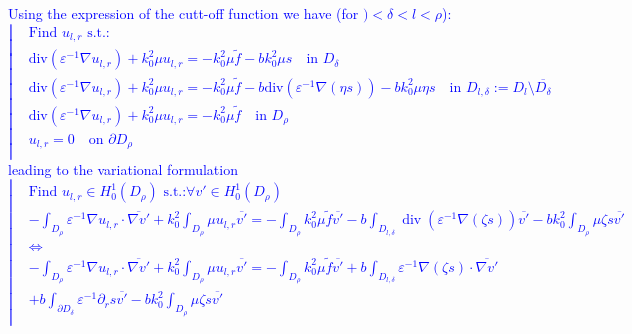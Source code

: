\documentclass[11pt]{article}
\newcommand{\grad}{\nabla}
\DeclareMathOperator{\diver}{{\mathrm{div}}}
\theoremstyle{plain}
\begin{document}
\textcolor{blue}{
Using the expression of the cutt-off function we have (for $) < \delta < l < \rho$):
\begin{equation}\label{eq:liftpbregbis}
\left|
\begin{aligned}
&\text{Find } u_{l,r} \text{ s.t.:} \\
&\displaystyle\text{div}\left(\varepsilon^{-1}\nabla u_{l,r}  \right) + {k_0^2} \mu  u_{l,r}  = - {k_0^2} \mu  \tilde{f}  - b {k_0^2} \mu  s\quad \text{in } D_\delta \\
&\displaystyle\text{div}\left(\varepsilon^{-1}\nabla u_{l,r}  \right) + {k_0^2} \mu  u_{l,r}  = - {k_0^2} \mu  \tilde{f} - b \displaystyle\text{div}\left(\varepsilon^{-1}\nabla (\eta s)  \right) - b {k_0^2} \mu  \eta s\quad \text{in } D_{l,\delta} := D_l \setminus \overline{D_\delta} \\
&\displaystyle\text{div}\left(\varepsilon^{-1}\nabla u_{l,r}  \right) + {k_0^2} \mu  u_{l,r}  = - {k_0^2} \mu  \tilde{f} \quad \text{in } D_\rho \\
& u_{l,r} = 0 \quad \text{on } \partial D_\rho \\
\end{aligned}
\right.
\end{equation}
leading to the variational formulation
\begin{equation}\label{FV_lift_reg_part_bis}
\left|
\begin{aligned}
&\text{Find } u_{l,r} \in H^1_0(D_\rho)\text{ s.t.:} \forall v' \in H^1_0(D_\rho) \\
&\displaystyle - \int_{D_\rho} \varepsilon^{-1}\nabla u_{l,r} \cdot \overline{\grad v'} + {k_0^2}\int_{D_\rho}  \mu  u_{l,r}  \overline{v'}= \displaystyle - \int_{D_\rho}  {k_0^2} \mu  \tilde{f} \overline{v'} - b \displaystyle  \int_{D_{l,\delta}} \displaystyle \diver(\varepsilon^{-1}\nabla (\zeta s) ) \overline{ v'} - b {k_0^2} \displaystyle  \int_{D_\rho} \mu  \zeta s  \overline{v'}\\
&\Longleftrightarrow \\
&\displaystyle - \int_{D_\rho} \varepsilon^{-1}\nabla u_{l,r} \cdot \overline{\grad v'} + {k_0^2}\int_{D_\rho}  \mu  u_{l,r}  \overline{v'}= \displaystyle - \int_{D_\rho}  {k_0^2} \mu  \tilde{f} \overline{v'}  + b \displaystyle  \int_{D_{l,\delta}} \displaystyle \varepsilon^{-1}\nabla (\zeta s) \cdot \overline{\nabla v'}  \\
&+ b \int_{\partial D_\delta} \varepsilon^{-1} \partial_r s \overline{v'}- b {k_0^2} \displaystyle  \int_{D_\rho} \mu  \zeta s  \overline{v'}\\
\end{aligned}
\right.
\end{equation}
}
\end{document}
